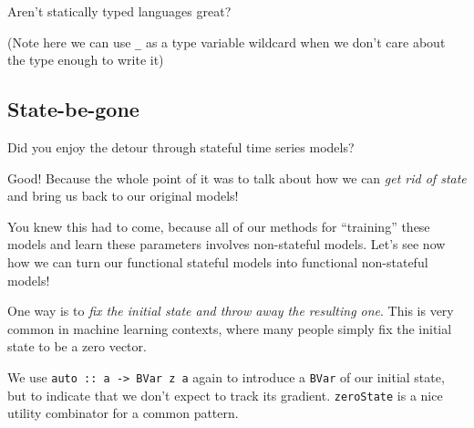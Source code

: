 \documentclass[]{article}
\newenvironment{Shaded}{}{}
\newcommand{\CommentTok}[1]{\textcolor[rgb]{0.38,0.63,0.69}{\textit{#1}}}
\newcommand{\DataTypeTok}[1]{\textcolor[rgb]{0.56,0.13,0.00}{#1}}
\newcommand{\DecValTok}[1]{\textcolor[rgb]{0.25,0.63,0.44}{#1}}
\newcommand{\FunctionTok}[1]{\textcolor[rgb]{0.02,0.16,0.49}{#1}}
\newcommand{\NormalTok}[1]{#1}
\newcommand{\OtherTok}[1]{\textcolor[rgb]{0.00,0.44,0.13}{#1}}
\begin{document}
Aren't statically typed languages great?

(Note here we can use \texttt{\_} as a type variable wildcard when we don't care
about the type enough to write it)

\hypertarget{state-be-gone}{%
\subsection{State-be-gone}\label{state-be-gone}}

Did you enjoy the detour through stateful time series models?

Good! Because the whole point of it was to talk about how we can \emph{get rid
of state} and bring us back to our original models!

You knew this had to come, because all of our methods for ``training'' these
models and learn these parameters involves non-stateful models. Let's see now
how we can turn our functional stateful models into functional non-stateful
models!

One way is to \emph{fix the initial state and throw away the resulting one}.
This is very common in machine learning contexts, where many people simply fix
the initial state to be a zero vector.

\begin{Shaded}
\end{Shaded}

We use \texttt{auto\ ::\ a\ -\textgreater{}\ BVar\ z\ a} again to introduce a
\texttt{BVar} of our initial state, but to indicate that we don't expect to
track its gradient. \texttt{zeroState} is a nice utility combinator for a common
pattern.
\end{document}
